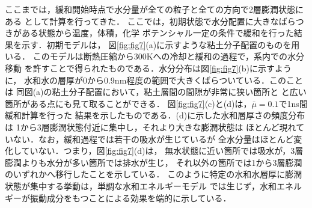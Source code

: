 ここまでは，緩和開始時点で水分量が全ての粒子と全ての方向で2層膨潤状態にある
として計算を行ってきた．
ここでは，初期状態で水分配置に大きなばらつきがある状態から温度，体積，化学
ポテンシャル一定の条件で緩和を行った結果を示す．初期モデルは，
図\ref{fig:fig7}(a)に示すような粘土分子配置のものを用いる．
このモデルは断熱圧縮から300Kへの冷却と緩和の過程で，系内での水分移動
を許すことで得られたものである．水分分布は図\ref{fig:fig7}(b)に示すように，
水和水の層厚が0から0.9nm程度の範囲で大きくばらついている．このことは
同図(a)の粘土分子配置において，粘土層間の間隙が非常に狭い箇所と
と広い箇所がある点にも見て取ることができる．
図\ref{fig:fig7}(c)と(d)は，$\bar{\mu}=0.1$で1ns間緩和計算を行った
結果を示したものである．(d)に示した水和層厚さの頻度分布は
1から3層膨潤状態付近に集中し，それより大きな膨潤状態は
ほとんど現れていない．なお，緩和過程では若干の吸水が生じているが
全水分量はほとんど変化していない．つまり，図\ref{fig:fig7}(d)は，
無水状態に近い箇所では吸水が，3層膨潤よりも水分が多い箇所では排水が生じ，
それ以外の箇所では1から3層膨潤のいずれかへ移行したことを示している．
このように特定の水和水層厚に膨潤状態が集中する挙動は，単調な水和エネルギーモデル
では生じず，水和エネルギーが振動成分をもつことによる効果を端的に示している．
